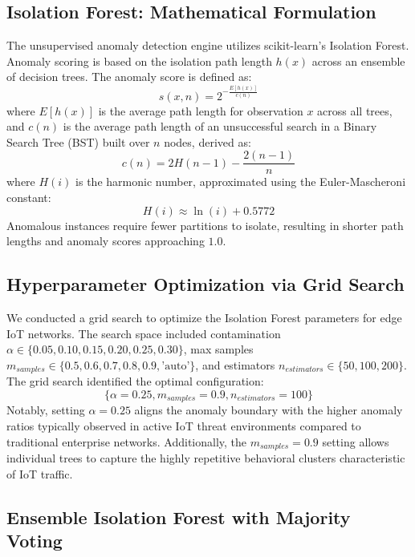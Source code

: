 \documentclass[journal]{IEEEtran}
\begin{document}
\subsection{Isolation Forest: Mathematical Formulation}
The unsupervised anomaly detection engine utilizes scikit-learn's Isolation Forest. Anomaly scoring is based on the isolation path length $h(x)$ across an ensemble of decision trees. The anomaly score is defined as:
\begin{equation}
s(x, n) = 2^{-\frac{E[h(x)]}{c(n)}}
\end{equation}
where $E[h(x)]$ is the average path length for observation $x$ across all trees, and $c(n)$ is the average path length of an unsuccessful search in a Binary Search Tree (BST) built over $n$ nodes, derived as:
\begin{equation}
c(n) = 2H(n-1) - \frac{2(n-1)}{n}
\end{equation}
where $H(i)$ is the harmonic number, approximated using the Euler-Mascheroni constant:
\begin{equation}
H(i) \approx \ln(i) + 0.5772
\end{equation}
Anomalous instances require fewer partitions to isolate, resulting in shorter path lengths and anomaly scores approaching $1.0$.

\subsection{Hyperparameter Optimization via Grid Search}
We conducted a grid search to optimize the Isolation Forest parameters for edge IoT networks. The search space included contamination $\alpha \in \{0.05, 0.10, 0.15, 0.20, 0.25, 0.30\}$, max samples $m_{samples} \in \{0.5, 0.6, 0.7, 0.8, 0.9, \text{'auto'}\}$, and estimators $n_{estimators} \in \{50, 100, 200\}$. The grid search identified the optimal configuration:
$$\{\alpha = 0.25, m_{samples} = 0.9, n_{estimators} = 100\}$$
Notably, setting $\alpha = 0.25$ aligns the anomaly boundary with the higher anomaly ratios typically observed in active IoT threat environments compared to traditional enterprise networks. Additionally, the $m_{samples} = 0.9$ setting allows individual trees to capture the highly repetitive behavioral clusters characteristic of IoT traffic.

\subsection{Ensemble Isolation Forest with Majority Voting}
\end{document}

